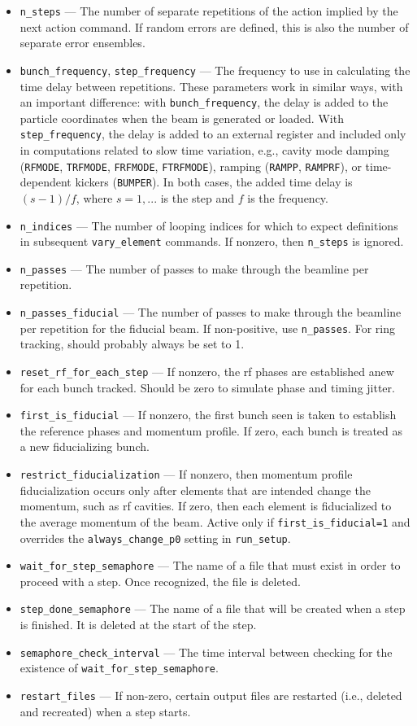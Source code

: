 \documentclass[11pt]{article}
\begin{document}
\begin{itemize}
\item \verb|n_steps| --- The number of separate repetitions of the action implied by the next action command.
If random errors are defined, this is also the number of separate error ensembles.
\item \verb|bunch_frequency|, \verb|step_frequency| --- The frequency to use in calculating the time delay between repetitions.
  These parameters work in similar ways, with an important difference: with \verb|bunch_frequency|, the delay is added to the particle
  coordinates when the beam is generated or loaded. With \verb|step_frequency|, the delay is added to an external register and included
  only in computations related to slow time variation, e.g., cavity mode damping (\verb|RFMODE|, \verb|TRFMODE|, \verb|FRFMODE|, \verb|FTRFMODE|),
  ramping (\verb|RAMPP|, \verb|RAMPRF|), or time-dependent kickers (\verb|BUMPER|). In both cases, the added time delay is $(s-1)/f$, where
  $s=1,...$ is the step and $f$ is the frequency.
\item \verb|n_indices| --- The number of looping indices for which to expect definitions in subsequent
  \verb|vary_element| commands.  If nonzero, then \verb|n_steps| is ignored.
\item \verb|n_passes| --- The number of passes to make through the beamline per repetition.
\item \verb|n_passes_fiducial| --- The number of passes to make through the beamline per repetition for the fiducial beam. If non-positive, use \verb|n_passes|.
  For ring tracking, should probably always be set to 1.
\item \verb|reset_rf_for_each_step| --- If nonzero, the rf phases are 
established anew for each bunch tracked.  Should be zero to simulate
phase and timing jitter. 
\item \verb|first_is_fiducial| --- If nonzero, the first bunch seen is taken
to establish the reference phases and momentum profile.  If zero, each bunch
is treated as a new fiducializing bunch.
\item \verb|restrict_fiducialization| --- If nonzero, then  momentum profile
fiducialization occurs only after elements that are intended
change the momentum, such as rf cavities.  If zero, then each element is
fiducialized to the average momentum of the beam.
Active only if \verb|first_is_fiducial=1| and overrides the \verb|always_change_p0| setting 
in \verb|run_setup|.
\item \verb|wait_for_step_semaphore| --- The name of a file that must exist in order to proceed
  with a step. Once recognized, the file is deleted.
\item \verb|step_done_semaphore|  --- The name of a file that will be created when a step is finished. It is deleted at the start of the step.
\item \verb|semaphore_check_interval| --- The time interval between checking for the existence of \verb|wait_for_step_semaphore|.
\item \verb|restart_files| --- If non-zero, certain output files are restarted (i.e., deleted and recreated) when a step starts.
\end{itemize}
\end{document}
